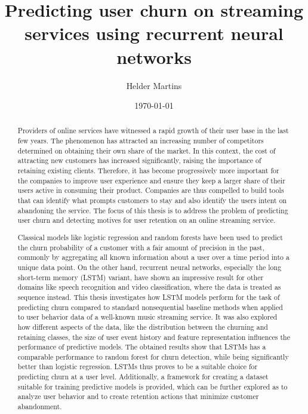 \documentclass{kththesis}
\title{Predicting user churn on streaming services using recurrent neural networks}
\author{Helder Martins}
\date{\today}
\begin{document}
\flyleaf

\begin{abstract}
Providers of online services have witnessed a rapid growth of their user base in the last few years. The phenomenon has attracted an increasing number of competitors determined on obtaining their own share of the market. In this context, the cost of attracting new customers has increased significantly, raising the importance of retaining existing clients. Therefore, it has become progressively more important for the companies to improve user experience and ensure they keep a larger share of their users active in consuming their product. Companies are thus compelled to build tools that can identify what prompts customers to stay and also identify the users intent on abandoning the service. The focus of this thesis is to address the problem of predicting user churn and detecting motives for user retention on an online streaming service. 

Classical models like logistic regression and random forests have been used to predict the churn probability of a customer with a fair amount of precision in the past, commonly by aggregating all known information about a user over a time period into a unique data point. On the other hand, recurrent neural networks, especially the long short-term memory (LSTM) variant, have shown an impressive result for other domains like speech recognition and video classification, where the data is treated as sequence instead. This thesis investigates how LSTM models perform for the task of predicting churn compared to standard nonsequential baseline methods when applied to user behavior data of a well-known music streaming service. It was also explored how different aspects of the data, like the distribution between the churning and retaining classes, the size of user event history and feature representation influences the performance of predictive models. The obtained results show that LSTMs has a comparable performance to random forest for churn detection, while being significantly better than logistic regression. LSTMs thus proves to be a suitable choice for predicting churn at a user level. Additionally, a framework for creating a dataset suitable for training predictive models is provided, which can be further explored as to analyze user behavior and to create retention actions that minimize customer abandonment.
\end{abstract}

\clearpage
\end{document}
